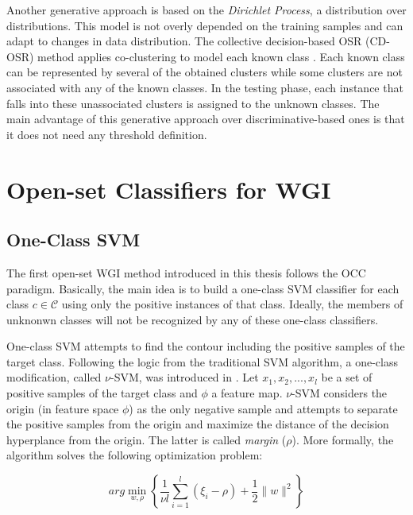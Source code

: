Another generative approach is based on the \textit{Dirichlet Process}, a distribution over distributions. This model is not overly depended on the training samples and can adapt to changes in data distribution. The collective decision-based OSR (CD-OSR) method applies co-clustering to model each known class \parencite{geng2018collective}. Each known class can be represented by several of the obtained clusters while some clusters are not associated with any of the known classes. In the testing phase, each instance that falls into these unassociated clusters is assigned to the unknown classes. The main advantage of this generative approach over discriminative-based ones is that it does not need any threshold definition.

\section{Open-set Classifiers for WGI}
\label{chap:openset:sec:Open_set_classifiers_for_WGI}

\subsection{One-Class SVM}\label{chap:openset:sec:OCSVM_description}

The first open-set WGI method introduced in this thesis follows the OCC paradigm. Basically, the main idea is to build a one-class SVM classifier for each class $c \in \mathcal{C}$ using only the positive instances of that class. Ideally, the members of unknonwn classes will not be recognized by any of these one-class classifiers.

One-class SVM attempts to find the contour including the positive samples of the target class. Following the logic from the traditional SVM algorithm, a one-class modification, called $\nu$-SVM, was introduced in \parencite{scholkopf1999estimating}. Let $x_1, x_2,..., x_l$ be a set of positive samples of the target class and $\phi$ a feature map. $\nu$-SVM considers the origin (in feature space $\phi$) as the only negative sample and attempts to separate the positive samples from the origin and maximize the distance of the decision hyperplance from the origin. The latter is called \textit{margin} ($\rho$). More formally, the algorithm solves the following optimization problem:

\begin{equation}\label{chap:openset:sec:eq:3}
	arg\min_{w,\rho}\left\{ \frac{1}{\nu l} \sum_{i=1}^{l}(\xi_{i}-\rho)+\frac{1}{2}\|w\|^{2}\right\}
\end{equation}


